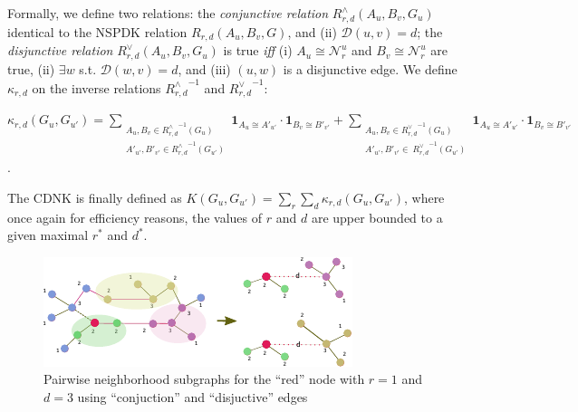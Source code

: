 \documentclass[review]{elsarticle}
\begin{document}
Formally, we define two relations: the \textit{conjunctive relation} $R^{\wedge}_{r,d}(A_u, B_v, G_u)$ identical to the NSPDK relation $R_{r,d}(A_u, B_v, G)$,  and (ii) $\mathcal{D}(u,v)= d$; the \textit{disjunctive relation} $R_{r,d}^{\vee}(A_u, B_v, G_u)$ is true {\em iff} (i)  $A_u \cong \mathcal{N}_r^u$ and $B_v \cong \mathcal{N}_r^u$ are true, (ii) $\exists w$ s.t. $\mathcal{D}(w,v)= d$, and (iii) $(u,w)$ is a disjunctive edge. We define $\kappa_{r,d}$ on the  inverse relations ${R^{\wedge}_{r,d}}^{ -1}$ and ${R^{\vee}_{r,d}}^{ -1}$:
\begin{center}
 $\kappa_{r,d}(G_u,G_{u'}) = \!\!\!\!\!\!\!\!\!\!\!\!
 \sum\limits_{\substack {A_u,{B}_{v} \in {R_{r,d}^{\wedge}}^{ -1}(G_u) \\ A'_{u'},{B'}_{v'} \in {R_{r,d}^{\wedge}}^{ -1}(G_{u'}) }} \!\!\!\!\!\!\!\!\!\!\!\!
  { \textbf{1}_{A_u \cong A'_{u'}} \cdot { \textbf{1}_{B_{v} \cong B'_{v'}}}}
+ \!\!\!\!\!\!\!\!\!\!\!\!
 \sum\limits_{\substack {A_u,{B}_{v} \in {R_{r,d}^{\vee}}^{ -1}(G_u) \\
  A'_{u'},{B'}_{v'} \in \ {R_{r,d}^{\vee}}^{ -1}(G_{u'}) }} \!\!\!\!\!\!\!\!\!\!\!\!
  { \textbf{1}_{A_u \cong A'_{u'}} \cdot { \textbf{1}_{B_{v} \cong B'_{v'}}}}
  $.
\end{center}
The CDNK is finally defined as $K(G_u,G_{u'}) = \sum\limits_{r}{\sum\limits_{d}{\kappa_{r,d}(G_u,G_{u'})}}$, where once again for efficiency reasons, the values of $r$ and $d$ are upper bounded to a given maximal $r^*$ and $d^*$.

\begin{figure}
\centering
\includegraphics[width=.9\textwidth]{cdnk}
\caption{Pairwise neighborhood subgraphs for the ``red'' node with $r=1$ and $d=3$ using ``conjuction'' and ``disjuctive'' edges}
\label{fig:cdnk}
\end{figure}
\end{document}
